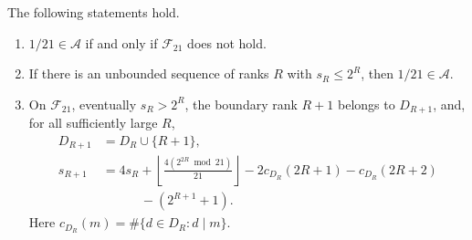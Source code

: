 \documentclass[11pt]{article}
\newcommand{\Ach}{\mathcal A}
\begin{document}
\begin{theorem}
\label{res:one-over-twenty-one-frontier}
The following statements hold.
\begin{enumerate}
\item $1/21\in\Ach$ if and only if $\mathcal F_{21}$ does not hold.
\item If there is an unbounded sequence of ranks $R$ with $s_R\le 2^R$,
  then $1/21\in\Ach$.
\item On $\mathcal F_{21}$, eventually $s_R>2^R$, the boundary rank $R+1$
  belongs to $D_{R+1}$, and, for all sufficiently large $R$,
\[
 \begin{aligned}
 D_{R+1}&=D_R\cup\{R+1\},\\
 s_{R+1}&=4s_R+
 \left\lfloor\frac{4(2^{2R}\bmod21)}{21}\right\rfloor
 -2c_{D_R}(2R+1)-c_{D_R}(2R+2)\\
 &\hspace{3em}{}-(2^{R+1}+1).
 \end{aligned}
\]
Here $c_{D_R}(m)=\#\{d\in D_R:d\mid m\}$.
\end{enumerate}
\end{theorem}
\end{document}
